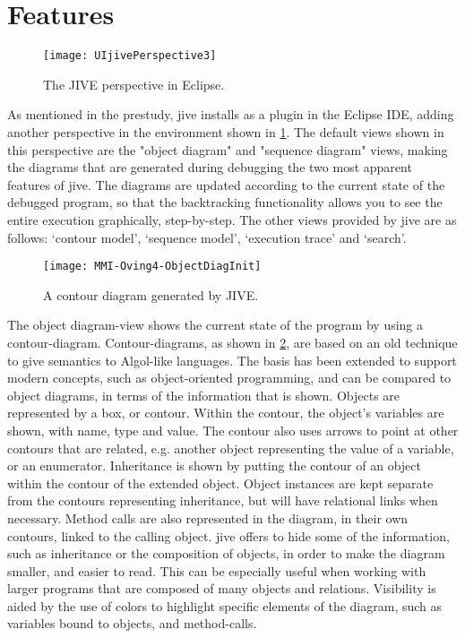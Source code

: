 \section{Features}\label{jiveFeatures}
\begin{figure}[H]
	\centering
	\texttt{[image: UIjivePerspective3]}
	\caption{The JIVE perspective in Eclipse.}
	\label{fig:UIjivePerspective}
\end{figure}

As mentioned in the prestudy, \gls{jive} installs as a plugin in the Eclipse IDE, adding another perspective in the environment shown in \cref{fig:UIjivePerspective}.
The default views shown in this perspective are the "object diagram" and "sequence diagram" views, making the diagrams that are generated during debugging the two most apparent features of \gls{jive}.
The diagrams are updated according to the current state of the debugged program, so that the backtracking functionality allows you to see the entire execution graphically, step-by-step.
The other views provided by \gls{jive} are as follows: `contour model', `sequence model', `execution trace' and `search'.

\begin{figure}[H]
	\centering
	\texttt{[image: MMI-Oving4-ObjectDiagInit]}
	\caption{A contour diagram generated by JIVE.}
	\label{fig:contOving4Init}
\end{figure}

The object diagram-view shows the current state of the program by using a contour-diagram.
Contour-diagrams, as shown in \cref{fig:contOving4Init}, are based on an old technique to give semantics to Algol-like languages.
The basis has been extended to support modern concepts, such as object-oriented programming, and can be compared to object diagrams, in terms of the information that is shown.
Objects are represented by a box, or contour.
Within the contour, the object's variables are shown, with name, type and value.
The contour also uses arrows to point at other contours that are related, e.g. another object representing the value of a variable, or an enumerator.
Inheritance is shown by putting the contour of an object within the contour of the extended object. 
Object instances are kept separate from the contours representing inheritance, but will have relational links when necessary.
Method calls are also represented in the diagram, in their own contours, linked to the calling object.
\gls{jive} offers to hide some of the information, such as inheritance or the composition of objects, in order to make the diagram smaller, and easier to read.
This can be especially useful when working with larger programs that are composed of many objects and relations.
Visibility is aided by the use of colors to highlight specific elements of the diagram, such as variables bound to objects, and method-calls.


